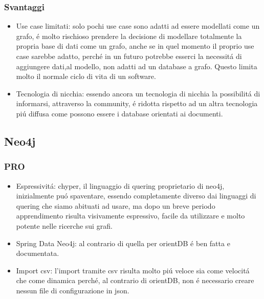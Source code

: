 \subsubsection{Svantaggi}

\begin{itemize}

\item{Use case limitati:} solo pochi use case sono adatti ad essere modellati come un grafo, \'e molto rischioso prendere la decisione di modellare totalmente la propria base di dati come un grafo, anche se in quel momento il proprio use case sarebbe adatto, perch\'e in un futuro potrebbe esserci la necessit\'a di aggiungere dati,al modello, non adatti ad un database a grafo. Questo limita molto il normale ciclo di vita di un software.

\item{Tecnologia di nicchia:} essendo ancora un tecnologia di nicchia la possibilit\'a di informarsi, attraverso la community, \'e ridotta rispetto ad un altra tecnologia pi\'u diffusa come possono essere i database orientati ai documenti.


\end{itemize}


\subsection{Neo4j}

\subsubsection{PRO}

\begin{itemize}
\item{Espressivit\'a:} chyper, il linguaggio di quering proprietario di neo4j, inizialmente pu\'o spaventare, essendo completamente diverso dai linguaggi di quering che siamo abituati ad usare, ma dopo un breve periodo apprendimento risulta visivamente espressivo, facile da utilizzare e molto potente nelle ricerche sui grafi.
\item{Spring Data Neo4j:} al contrario di quella per orientDB \'e ben fatta e documentata.
\item{Import csv:} l'import tramite csv risulta molto pi\'u veloce sia come velocit\'a che come dinamica perch\'e, al contrario di orientDB, non \'e necessario creare nessun file di configurazione in json.
\end{itemize}















